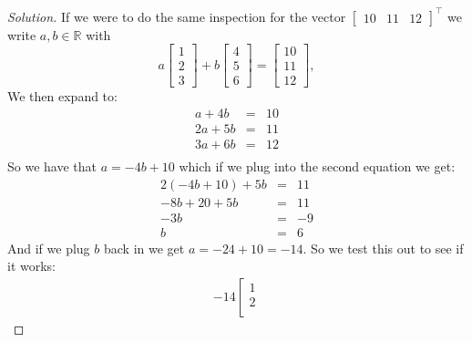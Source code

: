 \documentclass[12pt]{amsart}
\newenvironment{solution}
{\begin{proof}[Solution]}
{\end{proof}}
\begin{document}
\begin{onehalfspace}
\begin{solution}
            If we were to do the same inspection for the vector $[\begin{matrix}10 & 11 & 12\end{matrix}]^\top$ we write
            $a,b\in\mathbb{R}$ with
            \begin{displaymath}
                a\left[\begin{matrix}
                           1 \\
                           2 \\
                           3
                \end{matrix}\right] +
                b\left[\begin{matrix}
                           4 \\
                           5 \\
                           6
                \end{matrix}\right] =
                \left[\begin{matrix}
                          10 \\
                          11 \\
                          12
                \end{matrix}\right],
            \end{displaymath}
            We then expand to:
            \begin{eqnarray*}
                a + 4b & = & 10\\
                2a + 5b & = & 11 \\
                3a + 6b & = & 12 \\
            \end{eqnarray*}
            So we have that $a = -4b + 10$ which if we plug into the second equation we get:
            \begin{eqnarray*}
                2(-4b + 10) + 5b & = & 11 \\
                -8b + 20 + 5b & = & 11 \\
                -3b & = & -9 \\
                b & = & 6
            \end{eqnarray*}
            And if we plug $b$ back in we get $a = -24 + 10 = -14$. So we test this out to see if it works:
            \begin{eqnarray*}
                -14\left[\begin{matrix}
                           1 \\
                           2 \\

\end{matrix}
\end{eqnarray*}
\end{solution}
\end{onehalfspace}
\end{document}
